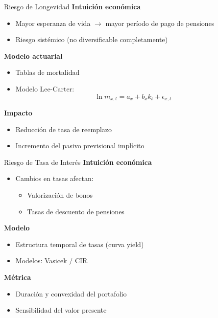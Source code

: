 \documentclass{beamer}
\begin{document}
\begin{frame}{Riesgo de Longevidad}
\textbf{Intuición económica}
\begin{itemize}
\item Mayor esperanza de vida $\rightarrow$ mayor período de pago de pensiones
\item Riesgo sistémico (no diversificable completamente)
\end{itemize}

\vspace{0.3cm}
\textbf{Modelo actuarial}
\begin{itemize}
\item Tablas de mortalidad
\item Modelo Lee-Carter:
\[
\ln m_{x,t} = a_x + b_x k_t + \epsilon_{x,t}
\]
\end{itemize}

\vspace{0.3cm}
\textbf{Impacto}
\begin{itemize}
\item Reducción de tasa de reemplazo
\item Incremento del pasivo previsional implícito
\end{itemize}
\end{frame}

\begin{frame}{Riesgo de Tasa de Interés}
\textbf{Intuición económica}
\begin{itemize}
\item Cambios en tasas afectan:
\begin{itemize}
\item Valorización de bonos
\item Tasas de descuento de pensiones
\end{itemize}
\end{itemize}

\vspace{0.3cm}
\textbf{Modelo}
\begin{itemize}
\item Estructura temporal de tasas (curva yield)
\item Modelos: Vasicek / CIR
\end{itemize}

\vspace{0.3cm}
\textbf{Métrica}
\begin{itemize}
\item Duración y convexidad del portafolio
\item Sensibilidad del valor presente
\end{itemize}
\end{frame}
\end{document}

